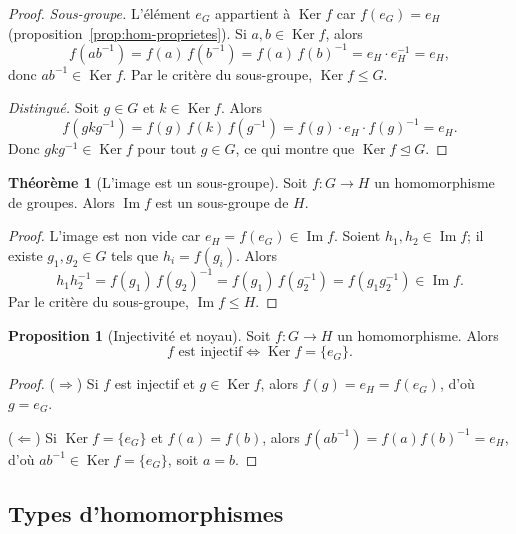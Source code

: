 \documentclass[12pt,a4paper,openany]{book}
\theoremstyle{definition}
\newtheorem{theoreme}{Théorème}[chapter]
\newtheorem{proposition}{Proposition}[chapter]
\DeclareMathOperator{\Ker}{Ker}
\renewcommand{\Im}{\operatorname{Im}}
\begin{document}
\begin{proof}
  \emph{Sous-groupe.} L'élément $e_G$ appartient à $\Ker f$ car
  $f(e_G)=e_H$ (proposition~\ref{prop:hom-proprietes}). Si
  $a,b\in\Ker f$, alors
  \[
    f(ab^{-1}) = f(a)\,f(b^{-1}) = f(a)\,f(b)^{-1} = e_H\cdot e_H^{-1} = e_H,
  \]
  donc $ab^{-1}\in\Ker f$. Par le critère du sous-groupe,
  $\Ker f\leq G$.

  \medskip

  \emph{Distingué.} Soit $g\in G$ et $k\in\Ker f$. Alors
  \[
    f(gkg^{-1}) = f(g)\,f(k)\,f(g^{-1}) = f(g)\cdot e_H\cdot f(g)^{-1} = e_H.
  \]
  Donc $gkg^{-1}\in\Ker f$ pour tout $g\in G$, ce qui montre que
  $\Ker f\trianglelefteq G$.
\end{proof}

\begin{theoreme}[L'image est un sous-groupe]\label{thm:im-sous-groupe}
  Soit $f\colon G\to H$ un homomorphisme de groupes. Alors
  $\Im f$ est un sous-groupe de $H$.
\end{theoreme}

\begin{proof}
  L'image est non vide car $e_H = f(e_G)\in\Im f$. Soient
  $h_1,h_2\in\Im f$; il existe $g_1,g_2\in G$ tels que $h_i=f(g_i)$.
  Alors
  \[
    h_1 h_2^{-1} = f(g_1)\,f(g_2)^{-1} = f(g_1)\,f(g_2^{-1}) = f(g_1 g_2^{-1})\in\Im f.
  \]
  Par le critère du sous-groupe, $\Im f\leq H$.
\end{proof}

\begin{proposition}[Injectivité et noyau]\label{prop:hom-injectif}
  Soit $f\colon G\to H$ un homomorphisme. Alors
  \[
    f \text{ est injectif} \iff \Ker f = \{e_G\}.
  \]
\end{proposition}

\begin{proof}
  ($\Rightarrow$) Si $f$ est injectif et $g\in\Ker f$, alors
  $f(g)=e_H=f(e_G)$, d'où $g=e_G$.

  ($\Leftarrow$) Si $\Ker f = \{e_G\}$ et $f(a)=f(b)$, alors
  $f(ab^{-1})=f(a)f(b)^{-1}=e_H$, d'où $ab^{-1}\in\Ker f=\{e_G\}$,
  soit $a=b$.
\end{proof}

\subsection{Types d'homomorphismes}\label{subsec:types-hom}
\end{document}
